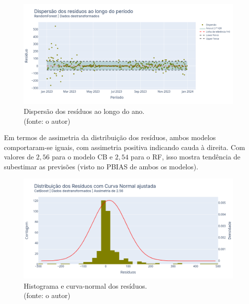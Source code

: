 \begin{figure}[!h]
\centering
\includegraphics[scale=0.33]{Figuras/jequiti/resultados/RF_WFV_LOG_RESID_x_TEMPO.png}
\caption{Dispersão dos resíduos ao longo do ano.\\(fonte: o autor)}
\label{fig:jequiti_RF_WFV_LOG_RESID_x_TEMPO}
\end{figure}
\clearpage

Em termos de assimetria da distribuição dos resíduos, ambos modelos comportaram-se iguais, com assimetria positiva indicando cauda à direita. Com valores de $2,56$ para o modelo CB e $2,54$ para o RF, isso mostra tendência de subestimar as previsões (visto no PBIAS de ambos os modelos).

\begin{figure}[!h]
\centering
\includegraphics[scale=0.33]{Figuras/jequiti/resultados/CB_WFV_LOG_RESID_x_CURVA_NORMAL.png}
\caption{Histograma e curva-normal dos resíduos.\\(fonte: o autor)}
\label{fig:jequiti_CB_WFV_LOG_RESID_x_CURVA_NORMAL}
\end{figure}

